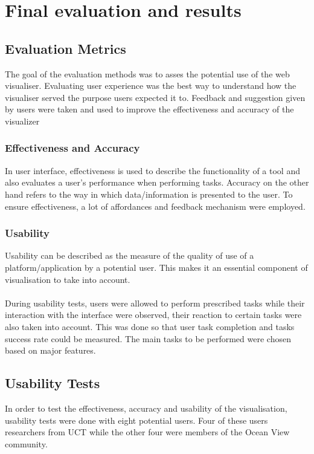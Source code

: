 \section{Final evaluation and results}
\subsection{Evaluation Metrics}
The goal of the evaluation methods was to asses the potential use of the web visualiser. Evaluating user experience was the best way to understand how the visualiser served the purpose users expected it to. Feedback and suggestion given by users were taken and used to improve the effectiveness and accuracy of the visualizer\cite{lam:hal-00723057}

\subsubsection{Effectiveness and Accuracy}
In user interface, effectiveness is used to describe the functionality of a tool and  also evaluates a user's performance when performing tasks. Accuracy on the other hand refers to the way in which data/information is presented to the user. To ensure effectiveness, a lot of affordances and feedback mechanism were employed.
\subsubsection{Usability}
Usability can be described as the measure of  the quality of use of a platform/application by a potential user. This makes it an essential component of visualisation to take into account\cite{1509067}.
\paragraph{}
During usability tests, users were allowed to perform prescribed tasks while their interaction with the interface were observed, their reaction to certain tasks were also taken into account. This was done so that user task completion and tasks success rate could be measured. The main tasks to be performed were chosen based on major features.


\subsection{Usability Tests}
In order to test the effectiveness, accuracy and usability of the visualisation, usability tests were done with eight potential users. Four of these users researchers from UCT while the other four were members of the Ocean View community. 
